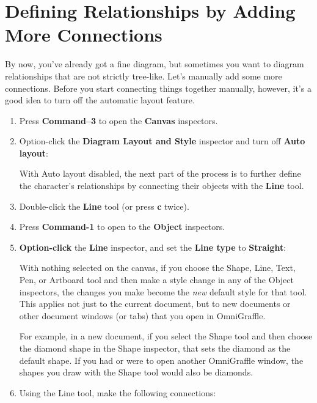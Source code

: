 \documentclass[../main.tex]{subfiles}
\begin{document}
\section{Defining Relationships by Adding More Connections}

By now, you've already got a fine diagram, but sometimes you want to diagram relationships that
are not strictly tree-like. Let's manually add some more connections. Before you start
connecting things together manually, however, it's a good idea to turn off the automatic
layout feature.

\begin{enumerate}
  \item Press \textbf{Command--3} to open the \textbf{Canvas} inspectors.
  \item Option-click the \textbf{Diagram Layout and Style} inspector and turn off \textbf{Auto
    layout}:


    With Auto layout disabled, the next part of the process is to further define the character's
    relationships by connecting their objects with the \textbf{Line} tool.
  \item Double-click the \textbf{Line} tool (or press \textbf{c} twice).
  \item Press \textbf{Command-1} to open to the \textbf{Object} inspectors.
  \item \textbf{Option-click} the \textbf{Line} inspector, and set the \textbf{Line type} to
    \textbf{Straight}:


    \begin{ognote}
      With nothing selected on the canvas, if you choose the Shape, Line, Text, Pen, or Artboard
      tool and then make a style change in any of the Object inspectors, the changes you make
      become the \textit{new} default style for that tool. This applies not just to the current
      document, but to new documents or other document windows (or tabs) that you open in
      OmniGraffle.

      For example, in a new document, if you select the Shape tool and then choose the diamond
      shape in the Shape inspector, that sets the diamond as the default shape. If you had or
      were to open another OmniGraffle window, the shapes you draw with the Shape tool would
      also be diamonds.
    \end{ognote}
  \item Using the Line tool, make the following connections:


\end{enumerate}
\end{document}
